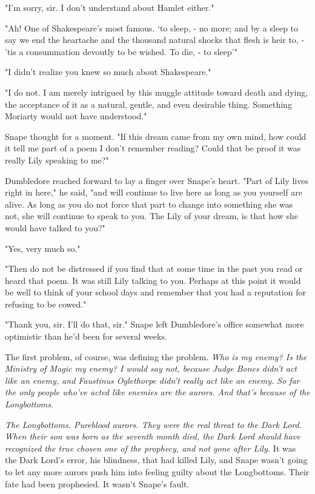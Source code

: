 "I'm sorry, sir. I don't understand about Hamlet either."

"Ah! One of Shakespeare's most famous. `{\el}to sleep, - no more; and by a sleep to say we end the heartache and the thousand natural shocks that flesh is heir to, - 'tis a consummation devoutly to be wished. To die, - to sleep{\el}'"

"I didn't realize you knew so much about Shakespeare."

"I do not. I am merely intrigued by this muggle attitude toward death and dying, the acceptance of it as a natural, gentle, and even desirable thing. Something Moriarty would not have understood."

Snape thought for a moment. "If this dream came from my own mind, how could it tell me part of a poem I don't remember reading? Could that be proof it was really Lily speaking to me?"

Dumbledore reached forward to lay a finger over Snape's heart. "Part of Lily lives right in here," he said, "and will continue to live here as long as you yourself are alive. As long as you do not force that part to change into something she was not, she will continue to speak to you. The Lily of your dream, is that how she would have talked to you?"

"Yes, very much so."

"Then do not be distressed if you find that at some time in the past you read or heard that poem. It was still Lily talking to you. Perhaps at this point it would be well to think of your school days and remember that you had a reputation for refusing to be cowed."

"Thank you, sir. I'll do that, sir." Snape left Dumbledore's office somewhat more optimistic than he'd been for several weeks.

The first problem, of course, was defining the problem. \emph{Who is my enemy? Is the Ministry of Magic my enemy? I would say not, because Judge Bones didn't act like an enemy, and Faustinus Oglethorpe didn't really act like an enemy. So far the only people who've acted like enemies are the aurors. And that's because of the Longbottoms.}

\emph{The Longbottoms. Pureblood aurors. They were the real threat to the Dark Lord. When their son was born as the seventh month died, the Dark Lord should have recognized the true chosen one of the prophecy, and not gone after Lily.} It was the Dark Lord's error, his blindness, that had killed Lily, and Snape wasn't going to let any more aurors push him into feeling guilty about the Longbottoms. Their fate had been prophesied. It wasn't Snape's fault.

